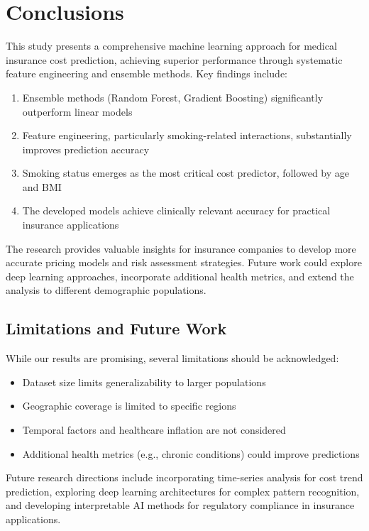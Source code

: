 \documentclass[times, twoside, watermark]{zHenriquesLab-StyleBioRxiv}
\begin{document}
\section*{Conclusions}

This study presents a comprehensive machine learning approach for medical insurance cost prediction, achieving superior performance through systematic feature engineering and ensemble methods. Key findings include:

\begin{enumerate}
\item Ensemble methods (Random Forest, Gradient Boosting) significantly outperform linear models
\item Feature engineering, particularly smoking-related interactions, substantially improves prediction accuracy
\item Smoking status emerges as the most critical cost predictor, followed by age and BMI
\item The developed models achieve clinically relevant accuracy for practical insurance applications
\end{enumerate}

The research provides valuable insights for insurance companies to develop more accurate pricing models and risk assessment strategies. Future work could explore deep learning approaches, incorporate additional health metrics, and extend the analysis to different demographic populations.

\subsection*{Limitations and Future Work}

While our results are promising, several limitations should be acknowledged:

\begin{itemize}
\item Dataset size limits generalizability to larger populations
\item Geographic coverage is limited to specific regions
\item Temporal factors and healthcare inflation are not considered
\item Additional health metrics (e.g., chronic conditions) could improve predictions
\end{itemize}

Future research directions include incorporating time-series analysis for cost trend prediction, exploring deep learning architectures for complex pattern recognition, and developing interpretable AI methods for regulatory compliance in insurance applications.
\end{document}
